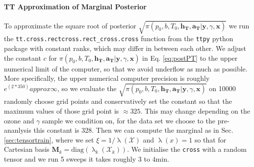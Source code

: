 \paragraph{TT Approximation of Marginal Posterior}
To approximate the square root of posterior $\sqrt{\pi(p_0,b,T_0,\bm{h_T},\bm{a_T} | \bm{y}, \gamma, \bm{x})}$ we run the  \texttt{tt.cross.rectcross.rect\_cross.cross} function from the \texttt{ttpy} python package \cite{Oseledets2018ttpy} with constant ranks, which may differ in between each other.
We adjust the constant $c$ for $\pi(p_0,b,T_0,\bm{h_T},\bm{a_T} | \bm{y}, \gamma, \bm{x})$ in Eq. \ref{eq:postPT} to the upper numerical limit of the computer, so that we avoid underflow as much as possible.
More specifically, the upper numerical computer precision is roughly $e^(2*350) approx \infty$, so we evaluate the  $\sqrt{\pi(p_0,b,T_0,\bm{h_T},\bm{a_T} | \bm{y}, \gamma, \bm{x})}$ on 10000 randomly choose grid points and conservatively set the constant so that the maximum values of those grid point is $\approx 325$.
This may change depending on the ozone and $\gamma$ sample we condition on, for the data set we choose to the pre-ananlysis this constant is $328$. 
Then we can compute the marginal as in Sec. \ref{sec:tensortrain}, where we set $\xi = 1 / \uplambda (\mathcal{X})$ and $\uplambda(x) = 1$ so that for Cartesian basis $\bm{M}_k = \text{diag}(\uplambda_k(\mathcal{X}_k))$.
We initialise the \texttt{cross}  with a random tensor and we run 5 sweeps it takes roughly $3$ to $4$min.

